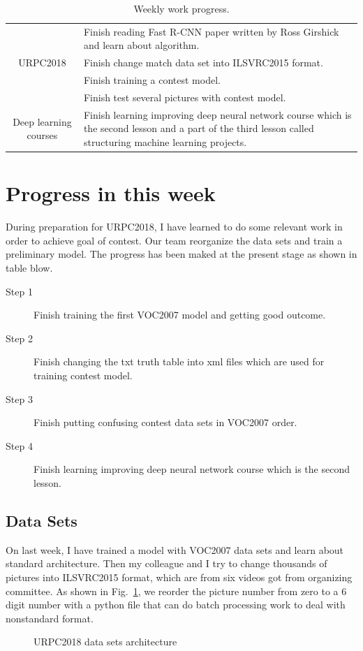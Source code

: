 \documentclass[a4paper]{article}
\begin{document}
\begin{table}[hb]
	\centering
	\caption{Weekly work progress.}
	\begin{tabular}{c|p{10cm}}
		\hline 
		& Finish reading Fast R-CNN paper written by Ross Girshick and learn about algorithm.\\
		
		URPC2018 & Finish change match data set into ILSVRC2015 format.\\
		
		& Finish training a contest model.\\
		
		& Finish test several pictures with contest model.\\
		\hline
		Deep learning courses & Finish learning improving deep neural network course which is the second lesson and a part of the third lesson called structuring machine learning projects. \\
		\hline
	\end{tabular}
	\label{t1}
\end{table} 


\section{Progress in this week}

During preparation for URPC2018, I have learned to do some relevant work in order to achieve goal of contest. Our team reorganize the data sets and train a preliminary model. The progress has been maked at the present stage as shown in table blow.
\begin{description}
	\item [Step 1] Finish training the first VOC2007 model and getting good outcome.
	\item[Step 2] Finish changing the txt truth table into xml files which are used for training contest model.
	\item[Step 3] Finish putting confusing contest data sets in VOC2007 order.
	\item[Step 4] Finish learning improving deep neural network course which is the second lesson.\label{t2}
\end{description}

\subsection{Data Sets}
On last week, I have trained a model with VOC2007 data sets and learn about standard architecture. Then my colleague and I try to change thousands of pictures into ILSVRC2015 format, which are from six videos got from organizing committee. As shown in Fig.~\ref{p1}, we reorder the picture number from zero to a 6 digit number with a python file that can do batch processing work to deal with nonstandard format.
\begin{figure} 
	\centering 
	\caption{URPC2018 data sets architecture} 
	\label{p1} %
\end{figure}
\end{document}
